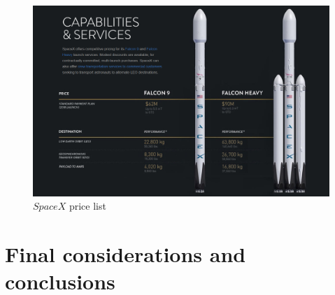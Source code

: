 \documentclass[11pt,a4paper,titlepage]{article}
\begin{document}
\begin{figure}
\centering
\includegraphics[width = .9\textwidth]{Spacex.png}
\caption{$SpaceX$ price list}
\label{fig:spacex}
\end{figure}

\section{Final considerations and conclusions}
	\lipsum[1]






















\end{document}
